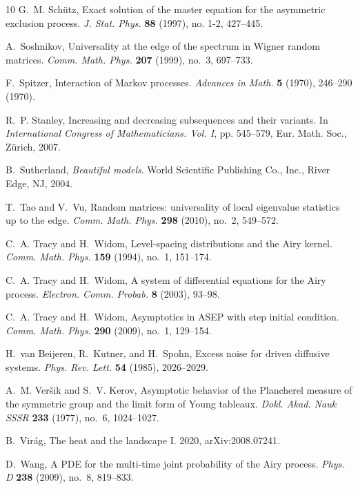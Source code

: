 \documentclass[10pt]{article}
\theoremstyle{plain}
\theoremstyle{definition}
\numberwithin{equation}{section}
\begin{document}
\begin{thebibliography}{10}
G.~M. Sch{\"u}tz, Exact solution of the master equation for the asymmetric
  exclusion process. \emph{J. Stat. Phys.} \textbf{88} (1997), no. 1-2,
  427--445.

A.~Soshnikov, Universality at the edge of the spectrum in {W}igner random
  matrices. \emph{Comm. Math. Phys.} \textbf{207} (1999), no.~3, 697--733.

F.~Spitzer, Interaction of {M}arkov processes. \emph{Advances in Math.}
  \textbf{5} (1970), 246--290 (1970).

R.~P. Stanley, Increasing and decreasing subsequences and their variants. In
  \emph{International {C}ongress of {M}athematicians. {V}ol. {I}}, pp.
  545--579, Eur. Math. Soc., Z\"{u}rich, 2007.

B.~Sutherland, \emph{Beautiful models}. World Scientific Publishing Co., Inc.,
  River Edge, NJ, 2004.

T.~Tao and V.~Vu, Random matrices: universality of local eigenvalue statistics
  up to the edge. \emph{Comm. Math. Phys.} \textbf{298} (2010), no.~2,
  549--572.

C.~A. Tracy and H.~Widom, Level-spacing distributions and the {A}iry kernel.
  \emph{Comm. Math. Phys.} \textbf{159} (1994), no.~1, 151--174.

C.~A. Tracy and H.~Widom, A system of differential equations for the {A}iry
  process. \emph{Electron. Comm. Probab.} \textbf{8} (2003), 93--98.

C.~A. Tracy and H.~Widom, Asymptotics in {ASEP} with step initial condition.
  \emph{Comm. Math. Phys.} \textbf{290} (2009), no.~1, 129--154.

H.~van Beijeren, R.~Kutner, and H.~Spohn, Excess noise for driven diffusive
  systems. \emph{Phys. Rev. Lett.} \textbf{54} (1985), 2026--2029.

A.~M. Ver\v{s}ik and S.~V. Kerov, Asymptotic behavior of the {P}lancherel
  measure of the symmetric group and the limit form of {Y}oung tableaux.
  \emph{Dokl. Akad. Nauk SSSR} \textbf{233} (1977), no.~6, 1024--1027.

B.~Vir{\'a}g, {The heat and the landscape I}. 2020, arXiv:2008.07241.

D.~Wang, A {PDE} for the multi-time joint probability of the {A}iry process.
  \emph{Phys. D} \textbf{238} (2009), no.~8, 819--833.

\end{thebibliography}
\end{document}
